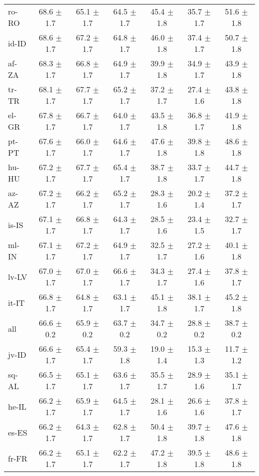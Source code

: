 \documentclass[11pt]{article}
\begin{document}
\begin{table*}[]
{\begin{tabular}{lcccccc}
ro-RO & 68.6 $\pm$ 1.7 & 65.1 $\pm$ 1.7 & 64.5 $\pm$ 1.7 & 45.4 $\pm$ 1.8 & 35.7 $\pm$ 1.7 & 51.6 $\pm$ 1.8 \\
id-ID & 68.6 $\pm$ 1.7 & 67.2 $\pm$ 1.7 & 64.8 $\pm$ 1.7 & 46.0 $\pm$ 1.8 & 37.4 $\pm$ 1.7 & 50.7 $\pm$ 1.8 \\
af-ZA & 68.3 $\pm$ 1.7 & 66.8 $\pm$ 1.7 & 64.9 $\pm$ 1.7 & 39.9 $\pm$ 1.8 & 34.9 $\pm$ 1.7 & 43.9 $\pm$ 1.8 \\
tr-TR & 68.1 $\pm$ 1.7 & 67.7 $\pm$ 1.7 & 65.2 $\pm$ 1.7 & 37.2 $\pm$ 1.7 & 27.4 $\pm$ 1.6 & 43.8 $\pm$ 1.8 \\
el-GR & 67.8 $\pm$ 1.7 & 66.7 $\pm$ 1.7 & 64.0 $\pm$ 1.7 & 43.5 $\pm$ 1.8 & 36.8 $\pm$ 1.7 & 41.9 $\pm$ 1.8 \\
pt-PT & 67.6 $\pm$ 1.7 & 66.0 $\pm$ 1.7 & 64.6 $\pm$ 1.7 & 47.6 $\pm$ 1.8 & 39.8 $\pm$ 1.8 & 48.6 $\pm$ 1.8 \\
hu-HU & 67.2 $\pm$ 1.7 & 67.7 $\pm$ 1.7 & 65.4 $\pm$ 1.7 & 38.7 $\pm$ 1.8 & 33.7 $\pm$ 1.7 & 44.7 $\pm$ 1.8 \\
az-AZ & 67.2 $\pm$ 1.7 & 66.2 $\pm$ 1.7 & 65.2 $\pm$ 1.7 & 28.3 $\pm$ 1.6 & 20.2 $\pm$ 1.4 & 37.2 $\pm$ 1.7 \\
is-IS & 67.1 $\pm$ 1.7 & 66.8 $\pm$ 1.7 & 64.3 $\pm$ 1.7 & 28.5 $\pm$ 1.6 & 23.4 $\pm$ 1.5 & 32.7 $\pm$ 1.7 \\
ml-IN & 67.1 $\pm$ 1.7 & 67.2 $\pm$ 1.7 & 64.9 $\pm$ 1.7 & 32.5 $\pm$ 1.7 & 27.2 $\pm$ 1.6 & 40.1 $\pm$ 1.8 \\
lv-LV & 67.0 $\pm$ 1.7 & 67.0 $\pm$ 1.7 & 66.6 $\pm$ 1.7 & 34.3 $\pm$ 1.7 & 27.4 $\pm$ 1.6 & 37.8 $\pm$ 1.7 \\
it-IT & 66.8 $\pm$ 1.7 & 64.8 $\pm$ 1.7 & 63.1 $\pm$ 1.7 & 45.1 $\pm$ 1.8 & 38.1 $\pm$ 1.7 & 45.2 $\pm$ 1.8 \\
all & 66.6 $\pm$ 0.2 & 65.9 $\pm$ 0.2 & 63.7 $\pm$ 0.2 & 34.7 $\pm$ 0.2 & 28.8 $\pm$ 0.2 & 38.7 $\pm$ 0.2 \\
jv-ID & 66.6 $\pm$ 1.7 & 65.4 $\pm$ 1.7 & 59.3 $\pm$ 1.8 & 19.0 $\pm$ 1.4 & 15.3 $\pm$ 1.3 & 11.7 $\pm$ 1.2 \\
sq-AL & 66.5 $\pm$ 1.7 & 65.1 $\pm$ 1.7 & 63.6 $\pm$ 1.7 & 35.5 $\pm$ 1.7 & 28.9 $\pm$ 1.6 & 35.1 $\pm$ 1.7 \\
he-IL & 66.2 $\pm$ 1.7 & 65.9 $\pm$ 1.7 & 64.5 $\pm$ 1.7 & 28.1 $\pm$ 1.6 & 26.6 $\pm$ 1.6 & 37.8 $\pm$ 1.7 \\
es-ES & 66.2 $\pm$ 1.7 & 64.3 $\pm$ 1.7 & 62.8 $\pm$ 1.7 & 50.4 $\pm$ 1.8 & 39.7 $\pm$ 1.8 & 47.6 $\pm$ 1.8 \\
fr-FR & 66.2 $\pm$ 1.7 & 65.1 $\pm$ 1.7 & 62.2 $\pm$ 1.7 & 47.2 $\pm$ 1.8 & 39.5 $\pm$ 1.8 & 48.6 $\pm$ 1.8 \\

\end{tabular}}
\end{table*}
\end{document}
